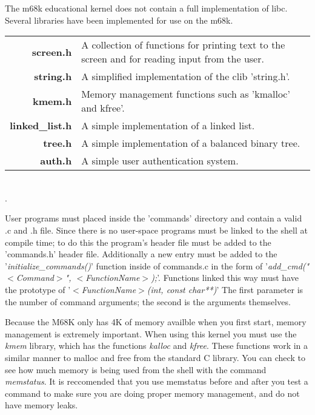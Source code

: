 \documentclass{article}
\begin{document}

The m68k educational kernel does not contain a full implementation of libc. Several libraries have been implemented for use on the m68k.\\

\begin{tabulary}{\textwidth}{r L}
\bf{screen.h} & A collection of functions for printing text to the screen and for reading input from the user.\\
\bf{string.h} & A simplified implementation of the clib 'string.h'.\\
\bf{kmem.h} & Memory management functions such as 'kmalloc' and kfree'.\\
\bf{linked\_list.h} & A simple implementation of a linked list.\\
\bf{tree.h} & A simple implementation of a balanced binary tree.\\
\bf{auth.h} & A simple user authentication system.\\
\end{tabulary}\\
{\tiny.}\\


User programs must placed inside the 'commands' directory and contain a valid .c and .h file. Since there is no user-space programs must be linked to the shell at compile time; to do this the program's header file must be added to the 'commands.h' header file. Additionally a new entry must be added to the '\emph{initialize\_commands()}' function inside of commands.c in the form of '\emph{add\_cmd("$<$Command$>$",  $<$FunctionName$>$);}'. Functions linked this way must have the prototype of '\emph{$<$FunctionName$>$(int, const char**)}' The first parameter is the number of command arguments; the second is the arguments themselves.\\


Because the M68K only has 4K of memory availble when you first start, memory management is extremely important. When using this kernel you must use the \emph{kmem} library, which has the functions \emph{kalloc} and \emph{kfree}. These functions work in a similar manner to malloc and free from the standard C library. You can check to see how much memory is being used from the shell with the command \emph{memstatus}. It is reccomended that you use memstatus before and after you test a command to make sure you are doing proper memory management, and do not have memory leaks.\\
\end{document}
